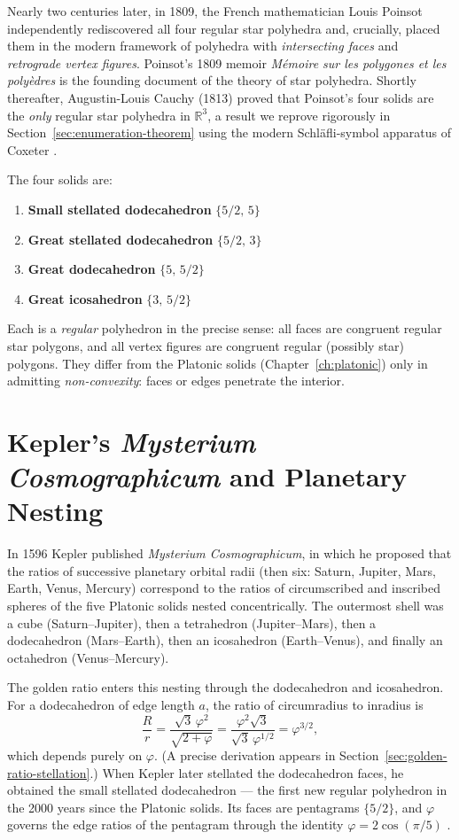 Nearly two centuries later, in 1809, the French mathematician
Louis Poinsot independently rediscovered all four regular star
polyhedra and, crucially, placed them in the modern framework
of polyhedra with \emph{intersecting faces} and
\emph{retrograde vertex figures}.  Poinsot's 1809 memoir
\emph{Mémoire sur les polygones et les polyèdres} is the
founding document of the theory of star polyhedra.  Shortly
thereafter, Augustin-Louis Cauchy (1813) proved that Poinsot's
four solids are the \emph{only} regular star polyhedra in
\(\mathbb{R}^3\), a result we reprove rigorously in
Section~\ref{sec:enumeration-theorem} using the modern
Schläfli-symbol apparatus of Coxeter
\cite{coxeter_regular_polytopes}.

The four solids are:
\begin{enumerate}
  \item \textbf{Small stellated dodecahedron} \(\{5/2,\,5\}\)
  \item \textbf{Great stellated dodecahedron} \(\{5/2,\,3\}\)
  \item \textbf{Great dodecahedron} \(\{5,\,5/2\}\)
  \item \textbf{Great icosahedron} \(\{3,\,5/2\}\)
\end{enumerate}
Each is a \emph{regular} polyhedron in the precise sense: all
faces are congruent regular star polygons, and all vertex
figures are congruent regular (possibly star) polygons.  They
differ from the Platonic solids (Chapter~\ref{ch:platonic})
only in admitting \emph{non-convexity}: faces or edges
penetrate the interior.

\section{Kepler's \emph{Mysterium Cosmographicum} and Planetary Nesting}
\label{sec:mysterium}

In 1596 Kepler published \emph{Mysterium Cosmographicum}, in
which he proposed that the ratios of successive planetary
orbital radii (then six: Saturn, Jupiter, Mars, Earth, Venus,
Mercury) correspond to the ratios of circumscribed and
inscribed spheres of the five Platonic solids nested
concentrically.  The outermost shell was a cube (Saturn–Jupiter),
then a tetrahedron (Jupiter–Mars), then a dodecahedron
(Mars–Earth), then an icosahedron (Earth–Venus), and finally an
octahedron (Venus–Mercury).

The golden ratio enters this nesting through the dodecahedron
and icosahedron.  For a dodecahedron of edge length $a$, the
ratio of circumradius to inradius is
\[
  \frac{R}{r} = \frac{\sqrt{3}\,\varphi^2}{\sqrt{2+\varphi}}
    = \frac{\varphi^2\sqrt{3}}{\sqrt{3}\,\varphi^{1/2}}
    = \varphi^{3/2},
\]
which depends purely on \(\varphi\).  (A precise derivation
appears in Section~\ref{sec:golden-ratio-stellation}.)  When
Kepler later stellated the dodecahedron faces, he obtained the
small stellated dodecahedron — the first new regular polyhedron
in the 2000 years since the Platonic solids.  Its faces are
pentagrams \(\{5/2\}\), and \(\varphi\) governs the edge
ratios of the pentagram through the identity
\(\varphi = 2\cos(\pi/5)\) \cite{coxeter_regular_polytopes}.

